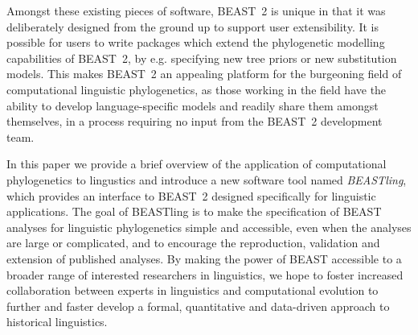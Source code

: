 \documentclass[twocolumn,10pt]{scrartcl}
\begin{document}
Amongst these existing pieces of software, BEAST~2 is unique in that it was deliberately designed from the ground up to support user extensibility.  It is possible for users to write packages which extend the phylogenetic modelling capabilities of BEAST~2, by e.g. specifying new tree priors or new substitution models.  This makes BEAST~2 an appealing platform for the burgeoning field of computational linguistic phylogenetics, as those working in the field have the ability to develop language-specific models and readily share them amongst themselves, in a process requiring no input from the BEAST~2 development team.

In this paper we provide a brief overview of the application of computational phylogenetics to lingustics and introduce a new software tool named \mbox{\emph{BEASTling}}, which provides an interface to BEAST~2 designed specifically for linguistic applications.  The goal of BEASTling is to make the specification of BEAST analyses for linguistic phylogenetics simple and accessible, even when the analyses are large or complicated, and to encourage the reproduction, validation and extension of published analyses.  By making the power of BEAST accessible to a broader range of interested researchers in linguistics, we hope to foster increased collaboration between experts in linguistics and computational evolution to further and faster develop a formal, quantitative and data-driven approach to historical linguistics.

\end{document}
